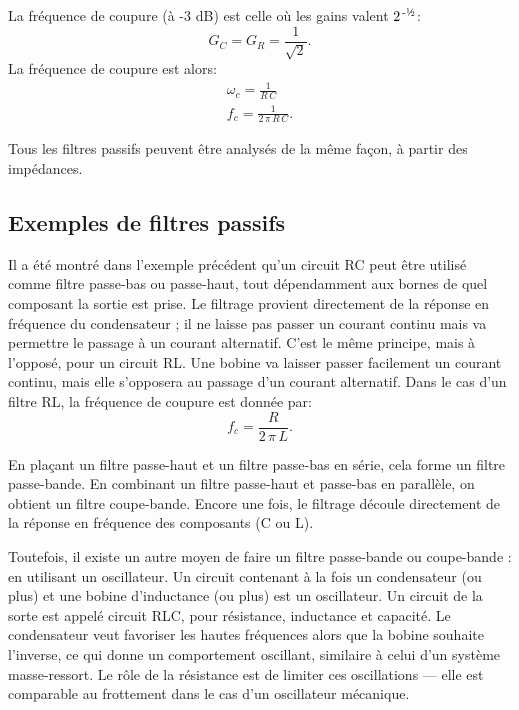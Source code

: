 \documentclass[canadien,12pt,oneside,letterpaper]{article}
\begin{document}
La fréquence de coupure (à -3 dB) est celle où les gains valent $2^{\,\text{-\textonehalf}}$:
\begin{equation}
G_C=G_R=\frac{1}{\sqrt{2}}.
\end{equation}
La fréquence de coupure est alors:
\begin{subequations}
\begin{gather}
\omega_c=\frac{1}{R\,C}\\
f_c=\frac{1}{2\,\pi\,R\,C}.
\end{gather}
\end{subequations}

Tous les filtres passifs peuvent être analysés de la même façon, à partir des impédances.


\subsection{Exemples de filtres passifs}

Il a été montré dans l'exemple précédent qu'un circuit RC peut être utilisé comme filtre passe-bas ou passe-haut, tout dépendamment aux bornes de quel composant la sortie est prise. Le filtrage provient directement de la réponse en fréquence du condensateur ; il ne laisse pas passer un courant continu mais va permettre le passage à un courant alternatif. C'est le même principe, mais à l'opposé, pour un circuit RL. Une bobine va laisser passer facilement un courant continu, mais elle s'opposera au passage d'un courant alternatif. Dans le cas d'un filtre RL, la fréquence de coupure est donnée par:
\begin{equation}
f_c=\frac{R}{2\,\pi\,L}.
\end{equation}

En plaçant un filtre passe-haut et un filtre passe-bas en série, cela forme un filtre passe-bande. En combinant un filtre passe-haut et passe-bas en parallèle, on obtient un filtre coupe-bande. Encore une fois, le filtrage découle directement de la réponse en fréquence des composants (C ou L).

Toutefois, il existe un autre moyen de faire un filtre passe-bande ou coupe-bande : en utilisant un oscillateur. Un circuit contenant à la fois un condensateur (ou plus) et une bobine d'inductance (ou plus) est un oscillateur. Un circuit de la sorte est appelé circuit RLC, pour résistance, inductance et capacité. Le condensateur veut favoriser les hautes fréquences alors que la bobine souhaite l'inverse, ce qui donne un comportement oscillant, similaire à celui d'un système masse-ressort. Le rôle de la résistance est de limiter ces oscillations --- elle est comparable au frottement dans le cas d'un oscillateur mécanique.
\end{document}
